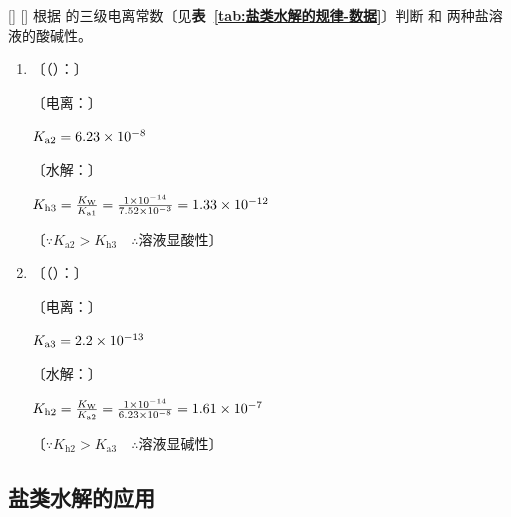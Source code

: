                     \begin{xmp}
                        [磷酸盐酸碱性判断例]
                        {}
                        []
                        []
                        根据  的三级电离常数〔见\textbf{表~\ref{tab:盐类水解的规律-数据}}〕判断  和  两种盐溶液的酸碱性。

                        \begin{enumerate}
                            \item 〔（）：〕
                            
                            〔电离：〕

                                \quad \( K_\text{a2} = \num{6.23E-8} \)
                            
                            〔水解：〕

                                \quad \( K_\text{h3} = \frac{K_\text{W}}{K_\text{a1}} = \frac{\num{1E-14}}{\num{7.52E-3}} = \num{1.33E-12} \)

                            〔\(\because K_\text{a2} > K_\text{h3} \quad \therefore \text{溶液显酸性}\)〕

                            \item 〔（）：〕
                            
                            〔电离：〕

                                \quad \( K_\text{a3} = \num{2.2E-13} \)
                            
                            〔水解：〕

                                \quad \( K_\text{h2} = \frac{K_\text{W}}{K_\text{a2}} = \frac{\num{1E-14}}{\num{6.23E-8}} = \num{1.61E-7} \)

                            〔\(\because K_\text{h2} > K_\text{a3} \quad \therefore \text{溶液显碱性}\)〕

                        \end{enumerate}
                    \end{xmp}

            \subsection{盐类水解的应用}\label{subsec:盐类水解的应用}
            
